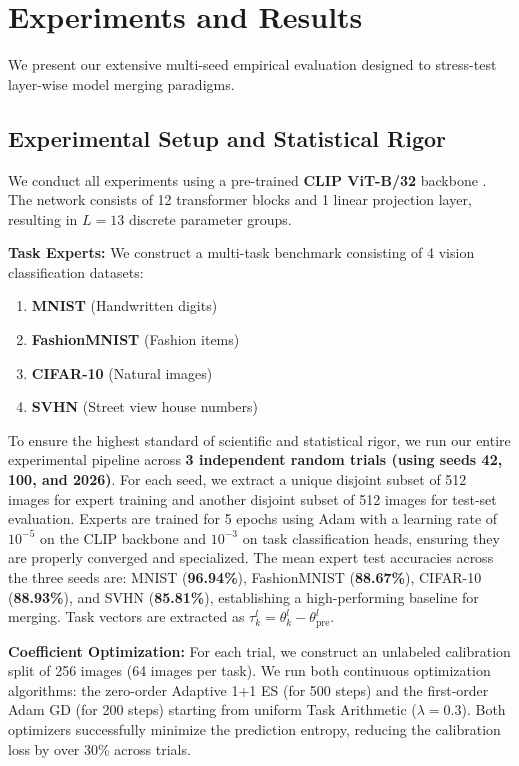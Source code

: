 \section{Experiments and Results}
\label{sec:experiments}

We present our extensive multi-seed empirical evaluation designed to stress-test layer-wise model merging paradigms.

\subsection{Experimental Setup and Statistical Rigor}
We conduct all experiments using a pre-trained \textbf{CLIP ViT-B/32} backbone \cite{radford2021learning}. The network consists of 12 transformer blocks and 1 linear projection layer, resulting in $L = 13$ discrete parameter groups. 

\textbf{Task Experts:} We construct a multi-task benchmark consisting of 4 vision classification datasets:
\begin{enumerate}
    \item \textbf{MNIST} (Handwritten digits) \cite{lecun1998gradient}
    \item \textbf{FashionMNIST} (Fashion items) \cite{xiao2017fashion}
    \item \textbf{CIFAR-10} (Natural images) \cite{krizhevsky2009learning}
    \item \textbf{SVHN} (Street view house numbers) \cite{netzer2011reading}
\end{enumerate}

To ensure the highest standard of scientific and statistical rigor, we run our entire experimental pipeline across \textbf{3 independent random trials (using seeds 42, 100, and 2026)}. For each seed, we extract a unique disjoint subset of 512 images for expert training and another disjoint subset of 512 images for test-set evaluation. Experts are trained for 5 epochs using Adam with a learning rate of $10^{-5}$ on the CLIP backbone and $10^{-3}$ on task classification heads, ensuring they are properly converged and specialized. The mean expert test accuracies across the three seeds are: MNIST (\textbf{96.94\%}), FashionMNIST (\textbf{88.67\%}), CIFAR-10 (\textbf{88.93\%}), and SVHN (\textbf{85.81\%}), establishing a high-performing baseline for merging. Task vectors are extracted as $\tau^l_k = \theta^l_k - \theta^l_{\text{pre}}$.

\textbf{Coefficient Optimization:} For each trial, we construct an unlabeled calibration split of 256 images (64 images per task). We run both continuous optimization algorithms: the zero-order Adaptive 1+1 ES (for 500 steps) and the first-order Adam GD (for 200 steps) starting from uniform Task Arithmetic ($\lambda = 0.3$). Both optimizers successfully minimize the prediction entropy, reducing the calibration loss by over 30\% across trials.

